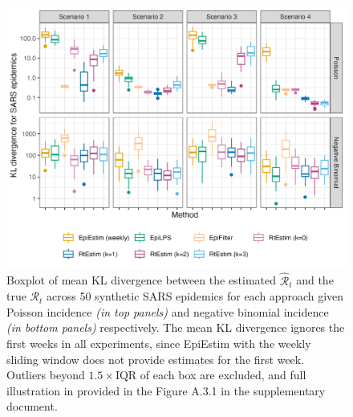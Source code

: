 \documentclass[10pt,letterpaper]{article}
\def\calR{\mathcal{R}}
\renewcommand{\hat}{\widehat}
\begin{document}
\begin{figure}[!ht]
  \centering
  \includegraphics[width=.99\textwidth]{fig/fig_kl_week_sars.png}
  \caption{Boxplot of mean KL divergence between the estimated 
  $\hat{\calR}_t$ and the true $\calR_t$ across 50 synthetic SARS epidemics for 
  each approach given Poisson incidence \textit{(in top panels)} and negative 
  binomial incidence \textit{(in bottom panels)} respectively. 
  The mean KL divergence ignores the first weeks in all experiments, 
  since EpiEstim with the weekly sliding window does not provide estimates 
  for the first week. Outliers beyond $1.5\times$IQR of each box are excluded, 
  and full illustration in provided in the Figure A.3.1 in the supplementary document.} 
  \label{fig:kl-res-sars}
\end{figure}
\end{document}
